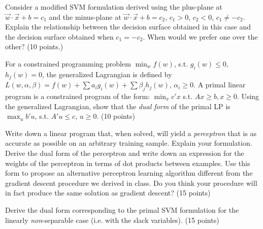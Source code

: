 \documentclass[fleqn]{homework}
\begin{document}
  \maketitle

  \begin{problem}{1}
    \begin{question}
      Consider a modified SVM formulation derived using the plus-plane at
      $\vec{w}\cdot\vec{x} + b = c_1$ and the minus-plane at
      $\vec{w}\cdot\vec{x}+b=c_2$, $c_1>0$, $c_2<0$, $c_1 \ne -c_2$.  Explain
      the relationship between the decision surface obtained in this case and
      the decision surface obtained when $c_1 = -c_2$.  When would we prefer one
      over the other? (10 points.)
    \end{question}
  \end{problem}

  \begin{problem}{2}
    \begin{question}
      For a constrained programming problem $\min_w f(w)$, s.t. $g_i(w) \le 0$,
      $h_j(w) = 0$, the generalized Lagrangian is defined by
      $L(w, \alpha, \beta) = f(w) + \sum a_i g_i(w) + \sum \beta_j h_j(w)$,
      $\alpha_i \ge 0$.  A primal linear program is a constrained program of the
      form: $\min_x c'x$ s.t. $Ax \ge b, x \ge 0$.  Using the generalized
      Lagrangian, show that the \textit{dual form} of the primal LP is
      $\max_u b' u$, s.t. $A' u \le c$, $u \ge 0$. (10 points)
    \end{question}
  \end{problem}

  \begin{problem}{3}
    \begin{question}
      Write down a linear program that, when solved, will yield a
      \textit{perceptron} that is as accurate as possible on an arbitrary
      training sample.  Explain your formulation.  Derive the dual form of the
      perceptron and write down an expression for the weights of the perceptron
      in terms of dot products between examples.  Use this form to propose an
      alternative perceptron learning algorithm different from the gradient
      descent procedure we derived in class.  Do you think your procedure will
      in fact produce the same solution as gradient descent? (15 points)
    \end{question}
  \end{problem}

  \begin{problem}{4}
    \begin{question}
      Derive the dual form corresponding to the primal SVM formulation for the
      linearly \textit{non}-separable case (i.e. with the slack variables). (15
      points)
    \end{question}
  \end{problem}
\end{document}
